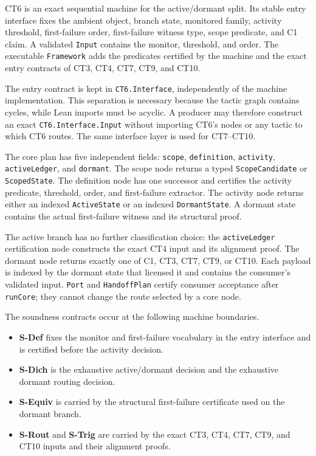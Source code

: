 \documentclass[
  11pt,
]{article}
\providecommand{\tightlist}{%
  \setlength{\itemsep}{0pt}\setlength{\parskip}{0pt}}
\theoremstyle{definition}
\begin{document}
CT6 is an exact sequential machine for the active/dormant split.  Its stable
entry interface fixes the ambient object, branch state, monitored family,
activity threshold, first-failure order, first-failure witness type, scope
predicate, and C1 claim.  A validated \texttt{Input} contains the monitor,
threshold, and order.  The executable \texttt{Framework} adds the predicates
certified by the machine and the exact entry contracts of CT3, CT4, CT7, CT9,
and CT10.

The entry contract is kept in \texttt{CT6.Interface}, independently of the
machine implementation.  This separation is necessary because the tactic
graph contains cycles, while Lean imports must be acyclic.  A producer may
therefore construct an exact \texttt{CT6.Interface.Input} without importing
CT6's nodes or any tactic to which CT6 routes.  The same interface layer is
used for CT7--CT10.

The core plan has five independent fields: \texttt{scope},
\texttt{definition}, \texttt{activity}, \texttt{activeLedger}, and
\texttt{dormant}.  The scope node returns a typed \texttt{ScopeCandidate} or
\texttt{ScopedState}.  The definition node has one successor and certifies
the activity predicate, threshold, order, and first-failure extractor.  The
activity node returns either an indexed \texttt{ActiveState} or an indexed
\texttt{DormantState}.  A dormant state contains the actual first-failure
witness and its structural proof.

The active branch has no further classification choice: the
\texttt{activeLedger} certification node constructs the exact CT4 input and
its alignment proof.  The dormant node returns exactly one of C1, CT3, CT7,
CT9, or CT10.  Each payload is indexed by the dormant state that licensed it
and contains the consumer's validated input.  \texttt{Port} and
\texttt{HandoffPlan} certify consumer acceptance after \texttt{runCore}; they
cannot change the route selected by a core node.

The soundness contracts occur at the following machine boundaries.
\begin{itemize}
\tightlist
\item \textbf{S-Def} fixes the monitor and first-failure vocabulary in the entry interface and is certified before the activity decision.
\item \textbf{S-Dich} is the exhaustive active/dormant decision and the exhaustive dormant routing decision.
\item \textbf{S-Equiv} is carried by the structural first-failure certificate used on the dormant branch.
\item \textbf{S-Rout} and \textbf{S-Trig} are carried by the exact CT3, CT4, CT7, CT9, and CT10 inputs and their alignment proofs.
\end{itemize}
\end{document}
